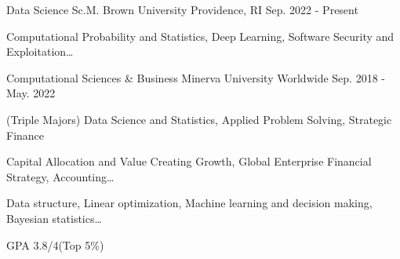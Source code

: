 \begin{cventries}
  \cventry
    {Data Science Sc.M.}
    {Brown University}
    {Providence, RI}
    {Sep. 2022 - Present}
    {
    \begin{cvitems}
        \item {Computational Probability and Statistics, Deep Learning, Software Security and Exploitation…}
    \end{cvitems}
    }

  \cventry
    {Computational Sciences \& Business}
    {Minerva University}
    {Worldwide}
    {Sep. 2018 - May. 2022}
    {
      \begin{cvitems}
        \item {(Triple Majors)  Data Science and Statistics, Applied Problem Solving, Strategic Finance}
        \item {Capital Allocation and Value Creating Growth, Global Enterprise Financial Strategy, Accounting…}
        \item {Data structure, Linear optimization, Machine learning and decision making, Bayesian statistics…}
        \item {GPA 3.8/4(Top 5\%)}
      \end{cvitems}
    }
\end{cventries}
